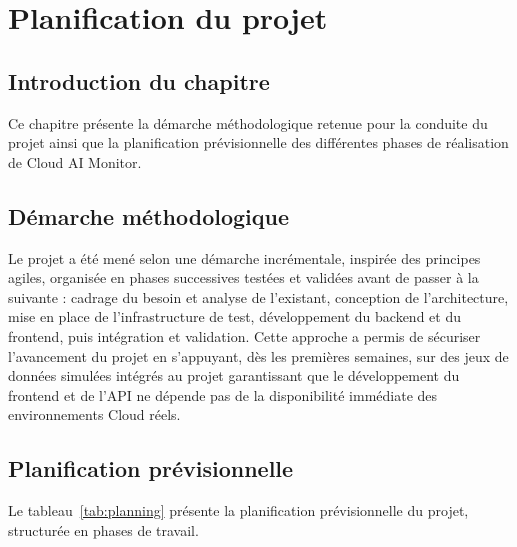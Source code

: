\documentclass[11pt,a4paper]{report}
\begin{document}
\chapter{Planification du projet}

\section*{Introduction du chapitre}

Ce chapitre présente la démarche méthodologique retenue pour la conduite du
projet ainsi que la planification prévisionnelle des différentes phases de
réalisation de Cloud AI Monitor.

\section{Démarche méthodologique}

Le projet a été mené selon une démarche incrémentale, inspirée des principes
agiles, organisée en phases successives testées et validées avant de passer à
la suivante : cadrage du besoin et analyse de l'existant, conception de
l'architecture, mise en place de l'infrastructure de test, développement du
backend et du frontend, puis intégration et validation. Cette approche a
permis de sécuriser l'avancement du projet en s'appuyant, dès les premières
semaines, sur des jeux de données simulées intégrés au projet
garantissant que le développement du frontend et de l'API ne dépende pas de
la disponibilité immédiate des environnements Cloud réels.

\section{Planification prévisionnelle}

Le tableau~\ref{tab:planning} présente la planification prévisionnelle du
projet, structurée en phases de travail.
\end{document}
